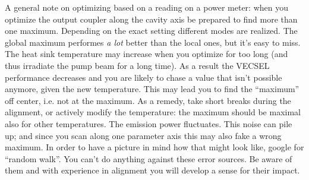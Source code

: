 A general note on optimizing
based on a reading on a power meter:
when you optimize the output coupler
along the cavity axis
be prepared to find more than one maximum.
Depending on the exact setting
different modes are realized.
The global maximum
performes \emph{a lot} better
than the local ones,
but it's easy to miss.
The heat sink temperature
may increase when you optimize for too long
(and thus irradiate the pump beam for a long time).
As a result the VECSEL performance
decreases and you are likely
to chase a value that isn't possible anymore,
given the new temperature.
This may lead you to find the ``maximum'' off center,
i.e. not at the maximum.
As a remedy,
take short breaks during the alignment,
or actively modify the temperature:
the maximum should be maximal also for other temperatures.
The emission power fluctuates.
This noise can pile up;
and since you scan along one parameter axis
this may also fake a wrong maximum.
In order to have a picture in mind
how that might look like,
google for ``random walk''.
You can't do anything against these error sources.
Be aware of them
and with experience in alignment
you will develop a sense for their impact.

